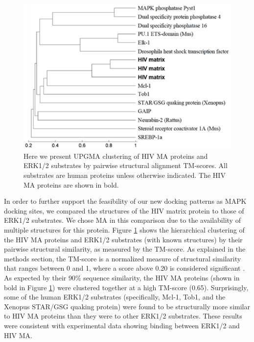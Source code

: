 \begin{figure}
\begin{center}
\includegraphics[scale=0.6]{figs/plos1_4}
\end{center}
\caption[MAPK substrate hierarchy]{\small Here we present UPGMA
  clustering of HIV MA proteins and ERK1/2 substrates by pairwise
  structural alignment TM-scores. All substrates are human proteins
  unless otherwise indicated. The HIV MA proteins are shown in
  bold. \label{fig:plos1:fig4}}
\end{figure}

In order to further support the feasibility of our new docking
patterns as MAPK docking sites, we compared the structures of the HIV
matrix protein to those of ERK1/2 substrates. We chose MA in this
comparison due to the availability of multiple structures for this
protein. Figure \ref{fig:plos1:fig4} shows the hierarchical clustering
of the HIV MA proteins and ERK1/2 substrates (with known structures)
by their pairwise structural similarity, as measured by the
TM-score. As explained in the methods section, the TM-score is a
normalized measure of structural similarity that ranges between 0 and
1, where a score above 0.20 is considered significant
\cite{zhang04}. As expected by their 90\% sequence similarity, the HIV
MA proteins (shown in bold in Figure \ref{fig:plos1:fig4}) were
clustered together at a high TM-score (0.65). Surprisingly, some of
the human ERK1/2 substrates (specifically, Mcl-1, Tob1, and the
Xenopus STAR/GSG quaking protein) were found to be structurally more
similar to HIV MA proteins than they were to other ERK1/2
substrates. These results were consistent with experimental data
showing binding between ERK1/2 and HIV MA.

